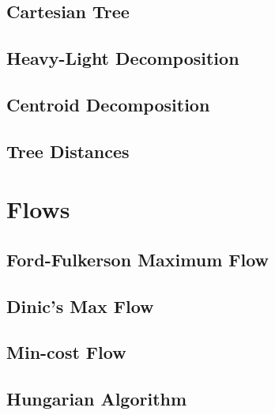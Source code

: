 \documentclass[10pt]{article}
\begin{document}
\begin{multicols*}{2}
\subsection{Cartesian Tree}


\subsection{Heavy-Light Decomposition}


\subsection{Centroid Decomposition}


\subsection{Tree Distances}


\section{Flows}

\subsection{Ford-Fulkerson Maximum Flow}


\subsection{Dinic's Max Flow}


\subsection{Min-cost Flow}


\subsection{Hungarian Algorithm}



\end{multicols*}
\end{document}
